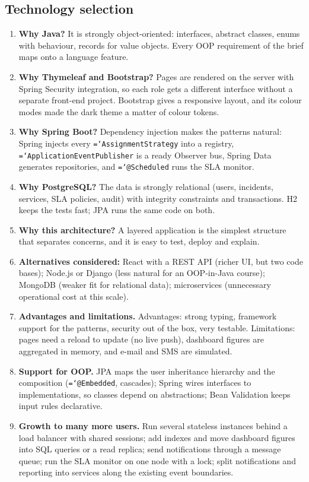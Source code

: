 \documentclass[11pt,a4paper]{article}
\newcommand{\code}[1]{\texttt{\hyphenchar\font=`\-\relax #1}}
\begin{document}
\subsection{Technology selection}
\begin{enumerate}[leftmargin=1.4em]
  \item \textbf{Why Java?} It is strongly object-oriented: interfaces, abstract classes, enums with behaviour, records for value objects. Every OOP requirement of the brief maps onto a language feature.
  \item \textbf{Why Thymeleaf and Bootstrap?} Pages are rendered on the server with Spring Security integration, so each role gets a different interface without a separate front-end project. Bootstrap gives a responsive layout, and its colour modes made the dark theme a matter of colour tokens.
  \item \textbf{Why Spring Boot?} Dependency injection makes the patterns natural: Spring injects every \code{AssignmentStrategy} into a registry, \code{ApplicationEvent\-Publisher} is a ready Observer bus, Spring Data generates repositories, and \code{@Scheduled} runs the SLA monitor.
  \item \textbf{Why PostgreSQL?} The data is strongly relational (users, incidents, services, SLA policies, audit) with integrity constraints and transactions. H2 keeps the tests fast; JPA runs the same code on both.
  \item \textbf{Why this architecture?} A layered application is the simplest structure that separates concerns, and it is easy to test, deploy and explain.
  \item \textbf{Alternatives considered:} React with a REST API (richer UI, but two code bases); Node.js or Django (less natural for an OOP-in-Java course); MongoDB (weaker fit for relational data); microservices (unnecessary operational cost at this scale).
  \item \textbf{Advantages and limitations.} Advantages: strong typing, framework support for the patterns, security out of the box, very testable. Limitations: pages need a reload to update (no live push), dashboard figures are aggregated in memory, and e-mail and SMS are simulated.
  \item \textbf{Support for OOP.} JPA maps the user inheritance hierarchy and the composition (\code{@Embedded}, cascades); Spring wires interfaces to implementations, so classes depend on abstractions; Bean Validation keeps input rules declarative.
  \item \textbf{Growth to many more users.} Run several stateless instances behind a load balancer with shared sessions; add indexes and move dashboard figures into SQL queries or a read replica; send notifications through a message queue; run the SLA monitor on one node with a lock; split notifications and reporting into services along the existing event boundaries.
\end{enumerate}
\end{document}
